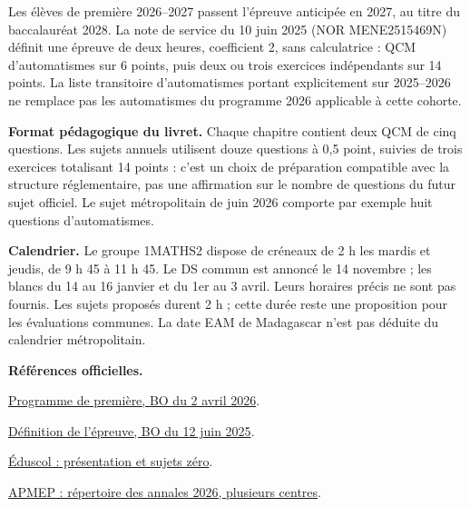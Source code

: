 Les élèves de première 2026--2027 passent l’épreuve anticipée en 2027, au titre du baccalauréat 2028. La note de service du 10 juin 2025 (NOR MENE2515469N) définit une épreuve de deux heures, coefficient 2, sans calculatrice : QCM d’automatismes sur 6 points, puis deux ou trois exercices indépendants sur 14 points. La liste transitoire d’automatismes portant explicitement sur 2025--2026 ne remplace pas les automatismes du programme 2026 applicable à cette cohorte.

\textbf{Format pédagogique du livret.} Chaque chapitre contient deux QCM de cinq questions. Les sujets annuels utilisent douze questions à 0,5 point, suivies de trois exercices totalisant 14 points : c’est un choix de préparation compatible avec la structure réglementaire, pas une affirmation sur le nombre de questions du futur sujet officiel. Le sujet métropolitain de juin 2026 comporte par exemple huit questions d’automatismes.

\textbf{Calendrier.} Le groupe 1MATHS2 dispose de créneaux de 2 h les mardis et jeudis, de 9 h 45 à 11 h 45. Le DS commun est annoncé le 14 novembre ; les blancs du 14 au 16 janvier et du 1er au 3 avril. Leurs horaires précis ne sont pas fournis. Les sujets proposés durent 2 h ; cette durée reste une proposition pour les évaluations communes. La date EAM de Madagascar n’est pas déduite du calendrier métropolitain.

\textbf{Références officielles.}\par
\href{https://www.education.gouv.fr/bo/2026/Hebdo14/MENE2602917A}{Programme de première, BO du 2 avril 2026}.\par
\href{https://www.education.gouv.fr/bo/2025/Hebdo24/MENE2515469N}{Définition de l’épreuve, BO du 12 juin 2025}.\par
\href{https://eduscol.education.gouv.fr/5688/epreuve-anticipee-de-mathematiques-aux-baccalaureats-general-et-technologique}{Éduscol : présentation et sujets zéro}.\par
\href{https://www.apmep.fr/Epreuve-anticipee-2026}{APMEP : répertoire des annales 2026, plusieurs centres}.
\tableofcontents
\clearpage
